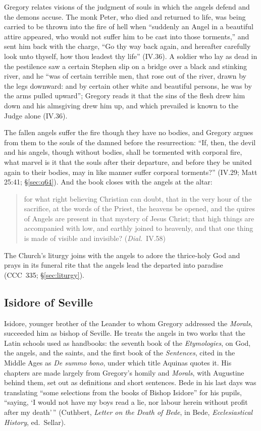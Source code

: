 Gregory relates visions of the judgment of souls in which the angels defend
and the demons accuse. The monk Peter, who died and returned to life, was
being carried to be thrown into the fire of hell when ``suddenly an Angel in
a beautiful attire appeared, who would not suffer him to be cast into those
torments,'' and sent him back with the charge, ``Go thy way back again, and
hereafter carefully look unto thyself, how thou leadest thy life''
(IV.36). A soldier who lay as dead in the pestilence saw a certain Stephen
slip on a bridge over a black and stinking river, and he ``was of certain
terrible men, that rose out of the river, drawn by the legs downward: and by
certain other white and beautiful persons, he was by the arms pulled
upward''; Gregory reads it that the sins of the flesh drew him down and his almsgiving
drew him up, and which prevailed is known to the Judge alone (IV.36).

The fallen angels suffer the fire though they have no bodies, and Gregory
argues from them to the souls of the damned before the resurrection: ``If,
then, the devil and his angels, though without bodies, shall be tormented
with corporal fire, what marvel is it that the souls after their departure,
and before they be united again to their bodies, may in like manner suffer
corporal torments?'' (IV.29; Matt 25:41; \S\ref{sec:q64}). And the book closes
with the angels at the altar:

\begin{quote}
for what right believing Christian can doubt, that in the very hour of the
sacrifice, at the words of the Priest, the heavens be opened, and the quires
of Angels are present in that mystery of Jesus Christ; that high things are
accompanied with low, and earthly joined to heavenly, and that one thing is
made of visible and invisible? (\emph{Dial.}\ IV.58)
\end{quote}

\noindent The Church's liturgy joins with the angels to adore the thrice-holy
God and prays in its funeral rite that the angels lead the departed into
paradise (CCC~335; \S\ref{sec:liturgy}).

\sectionguard
\subsection{Isidore of Seville}\label{sec:fa-isidore}

Isidore, younger brother of the Leander to whom Gregory addressed the
\emph{Morals}, succeeded him as bishop of Seville. He treats the angels in two
works that the Latin schools used as handbooks: the seventh book of the
\emph{Etymologies}, on God, the angels, and the saints, and
the first book of the \emph{Sentences}, cited in the Middle Ages as \emph{De
summo bono}, under which title Aquinas quotes it. His chapters are made
largely from Gregory's homily and \emph{Morals}, with Augustine behind them,
set out as definitions and short sentences. Bede in his last days was
translating ``some selections from the books of Bishop Isidore'' for his
pupils, ``saying, `I would not have my boys read a lie, nor labour herein
without profit after my death'\,'' (Cuthbert, \emph{Letter on the Death of
Bede}, in Bede, \emph{Ecclesiastical History}, ed.\ Sellar).


